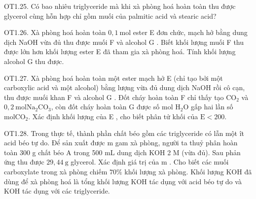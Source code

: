 \documentclass[10pt]{article}
\begin{document}
OT1.25. Có bao nhiêu triglyceride mà khi xà phòng hoá hoàn toàn thu được glycerol cùng hỗn hợp chỉ gồm muối của palmitic acid và stearic acid?

OT1.26. Xà phòng hoá hoàn toàn $0,1 \mathrm{~mol}$ ester E đơn chức, mạch hở bằng dung dịch NaOH vừa đủ thu được muối F và alcohol G . Biết khối lượng muối F thu được lớn hơn khối lượng ester E đã tham gia xà phòng hoá. Tính khối lượng alcohol G thu được.

OT1.27. Xà phòng hoá hoàn toàn một ester mạch hở E (chỉ tạo bởi một carboxylic acid và một alcohol) bằng lượng vừa đủ dung dịch NaOH rồi cô cạn, thu được muối khan F và alcohol G . Đốt cháy hoàn toàn F chỉ thấy tạo $\mathrm{CO}_{2}$ và $0,2 \mathrm{~mol} \mathrm{Na}_{2} \mathrm{CO}_{3}$, còn đốt cháy hoàn toàn G được số mol $\mathrm{H}_{2} \mathrm{O}$ gấp hai lần số $\mathrm{mol} \mathrm{CO}_{2}$. Xác định khối lượng của E , cho biết phân tử khối của $\mathrm{E}<200$.

OT1.28. Trong thực tế, thành phần chất béo gồm các triglyceride có lẫn một ît acid béo tự do. Để sản xuất được m gam xà phòng, người ta thuỷ phân hoàn toàn 300 g chất béo A trong 500 mL dung dịch KOH 2 M (vừa đủ). Sau phản ứng thu được $29,44 \mathrm{~g}$ glycerol. Xác định giá trị của m . Cho biết các muối carboxylate trong xà phòng chiếm $70 \%$ khối lượng xà phòng. Khối lượng KOH đã dùng để xà phòng hoá là tổng khối lượng KOH tác dụng với acid béo tự do và KOH tác dụng với các triglyceride.
\end{document}
